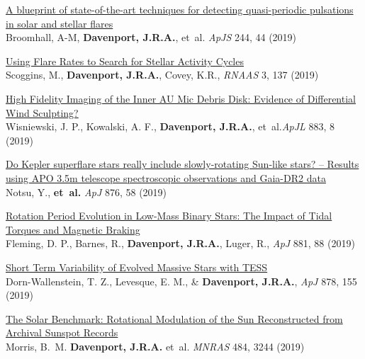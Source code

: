 \begin{etaremune}[leftmargin=10pt]

\item{\sc \href{https://arxiv.org/abs/1910.08458}{\color{NavyBlue} A blueprint of state-of-the-art techniques for detecting quasi-periodic pulsations in solar and stellar flares}}\\
Broomhall, A-M, {\bf Davenport,  J.R.A.}, et~al. {\em ApJS} 244, 44 (2019)

\item{\sc \href{https://doi.org/10.3847/2515-5172/ab45a0}{\color{NavyBlue}Using Flare Rates to Search for Stellar Activity Cycles}}\\
Scoggins, M., {\bf Davenport, J.R.A.}, Covey, K.R., {\em RNAAS} 3, 137 (2019)


\item{\sc\href{http://arxiv.org/abs/1907.10113}{\color{NavyBlue}High Fidelity Imaging of the Inner AU Mic Debris Disk: Evidence of Differential Wind Sculpting?}}\\
Wisniewski, J. P., Kowalski, A. F., {\bf Davenport,  J.R.A.}, et~al.{\em ApJL} 883, 8 (2019)

\item{\sc\href{https://arxiv.org/abs/1904.00142}{\color{NavyBlue}Do Kepler superflare stars really include slowly-rotating Sun-like stars? -- Results using APO 3.5m telescope spectroscopic observations and Gaia-DR2 data }}\\
Notsu, Y., {\bf et~al.} {\em ApJ} 876, 58 (2019)

\item{\sc\href{https://arxiv.org/abs/1903.05686}{\color{NavyBlue}Rotation Period Evolution in Low-Mass Binary Stars: The Impact of Tidal Torques and Magnetic Braking}}\\
Fleming, D. P., Barnes, R., {\bf Davenport, J.R.A.}, Luger, R., {\em ApJ} 881, 88 (2019)


\item{\sc\href{https://arxiv.org/abs/1901.09930}{\color{NavyBlue}Short Term Variability of Evolved Massive Stars with TESS}}\\
Dorn-Wallenstein, T. Z., Levesque, E. M., \& {\bf Davenport, J.R.A.}, {\em ApJ} 878, 155 (2019)

\item{\sc\href{https://arxiv.org/abs/1901.04557}{\color{NavyBlue}The Solar Benchmark: Rotational Modulation of the Sun Reconstructed from Archival Sunspot Records}}\\
Morris, B.~M. {\bf Davenport, J.R.A.} et~al. {\em MNRAS} 484, 3244 (2019)



\end{etaremune}

